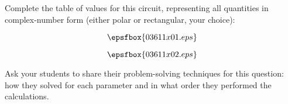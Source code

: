 

Complete the table of values for this circuit, representing all quantities in complex-number form (either polar or rectangular, your choice):

$$\epsfbox{03611x01.eps}$$







$$\epsfbox{03611x02.eps}$$







Ask your students to share their problem-solving techniques for this question: how they solved for each parameter and in what order they performed the calculations.




